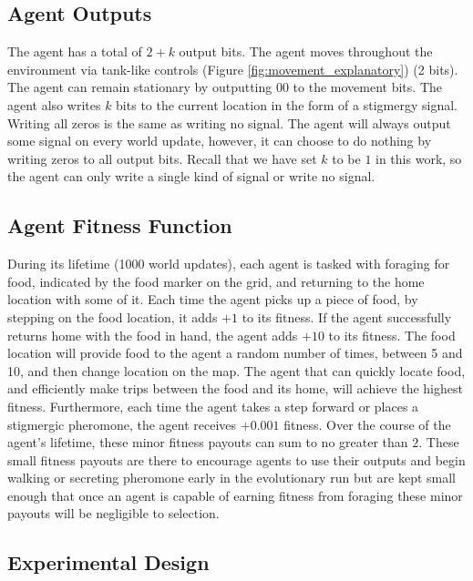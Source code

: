 

\subsection*{Agent Outputs}

The agent has a total of $2+k$ output bits. The agent moves throughout the environment via tank-like controls (Figure \ref{fig:movement_explanatory}) (2 bits). The agent can remain stationary by outputting $00$ to the movement bits. The agent also writes $k$ bits to the current location in the form of a stigmergy signal. Writing all zeros is the same as writing no signal. The agent will always output some signal on every world update, however, it can choose to do nothing by writing zeros to all output bits. Recall that we have set $k$ to be $1$ in this work, so the agent can only write a single kind of signal or write no signal.



\subsection*{Agent Fitness Function}

During its lifetime (1000 world updates), each agent is tasked with foraging for food, indicated by the food marker on the grid, and returning to the home location with some of it. Each time the agent picks up a piece of food, by stepping on the food location, it adds $+1$ to its fitness. If the agent successfully returns home with the food in hand, the agent adds $+10$ to its fitness. The food location will provide food to the agent a random number of times, between 5 and 10, and then change location on the map. The agent that can quickly locate food, and efficiently make trips between the food and its home, will achieve the highest fitness. Furthermore, each time the agent takes a step forward or places a stigmergic pheromone, the agent receives $+0.001$ fitness. Over the course of the agent's lifetime, these minor fitness payouts can sum to no greater than $2$. These small fitness payouts are there to encourage agents to use their outputs and begin walking or secreting pheromone early in the evolutionary run but are kept small enough that once an agent is capable of earning fitness from foraging these minor payouts will be negligible to selection.

\subsection {Experimental Design}

